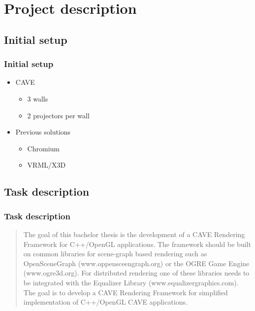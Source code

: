 \section{Project description}

\subsection{Initial setup}
\begin{frame}\frametitle{Initial setup}
	\begin{itemize}
		\item<1-> CAVE
		\begin{itemize}
			\item 3 walls
			\item 2 projectors per wall
		\end{itemize}
		\item<2-> Previous solutions
		\begin{itemize}
			\item Chromium
			\item VRML/X3D
		\end{itemize}
	\end{itemize}
\end{frame}

\subsection{Task description}

\begin{frame}\frametitle{Task description}
	\begin{quote}
		The goal of this bachelor thesis is the development of a CAVE Rendering Framework for C++/OpenGL applications. The framework should be built on common libraries for scene-graph based rendering such as OpenSceneGraph (www.oppensceengraph.org) or the OGRE Game Engine (www.ogre3d.org). For distributed rendering one of these libraries needs to be integrated with the Equalizer Library (www.equalizergraphics.com). The goal is to develop a CAVE Rendering Framework for simplified implementation of C++/OpenGL CAVE applications.
	\end{quote}
\end{frame}

